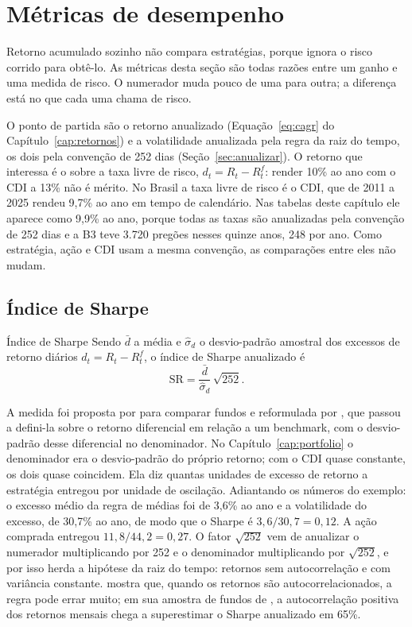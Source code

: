 \section{Métricas de desempenho}
\label{sec:c10-metricas}

Retorno acumulado sozinho não compara estratégias, porque ignora o risco corrido para obtê-lo. As métricas desta seção são todas razões entre um ganho e uma medida de risco. O numerador muda pouco de uma para outra; a diferença está no que cada uma chama de risco.

O ponto de partida são o retorno anualizado (Equação~\eqref{eq:cagr} do Capítulo~\ref{cap:retornos}) e a volatilidade anualizada pela regra da raiz do tempo, os dois pela convenção de 252 dias (Seção~\ref{sec:anualizar}). O retorno que interessa é o  sobre a taxa livre de risco, $d_t = R_t - R^f_t$: render 10\% ao ano com o CDI a 13\% não é mérito. No Brasil a taxa livre de risco é o CDI, que de 2011 a 2025 rendeu 9,7\% ao ano em tempo de calendário. Nas tabelas deste capítulo ele aparece como 9,9\% ao ano, porque todas as taxas são anualizadas pela convenção de 252 dias e a B3 teve 3.720 pregões nesses quinze anos, 248 por ano. Como estratégia, ação e CDI usam a mesma convenção, as comparações entre eles não mudam.

\subsection{Índice de Sharpe}

\begin{definicao}{Índice de Sharpe}
Sendo $\bar d$ a média e $\hat\sigma_d$ o desvio-padrão amostral dos excessos de retorno diários $d_t = R_t - R^f_t$, o índice de Sharpe anualizado é
\begin{equation}
  \text{SR} = \frac{\bar d}{\hat\sigma_d}\,\sqrt{252} .
  \label{eq:c10-sharpe}
\end{equation}
\end{definicao}

A medida foi proposta por \citet{sharpe1966} para comparar fundos e reformulada por \citet{sharpe1994}, que passou a defini-la sobre o retorno diferencial em relação a um benchmark, com o desvio-padrão desse diferencial no denominador. No Capítulo~\ref{cap:portfolio} o denominador era o desvio-padrão do próprio retorno; com o CDI quase constante, os dois quase coincidem. Ela diz quantas unidades de excesso de retorno a estratégia entregou por unidade de oscilação. Adiantando os números do exemplo: o excesso médio da regra de médias foi de 3,6\% ao ano e a volatilidade do excesso, de 30,7\% ao ano, de modo que o Sharpe é $3,6/30,7 = 0,12$. A ação comprada entregou $11,8/44,2 = 0,27$. O fator $\sqrt{252}$ vem de anualizar o numerador multiplicando por 252 e o denominador multiplicando por $\sqrt{252}$, e por isso herda a hipótese da raiz do tempo: retornos sem autocorrelação e com variância constante. \citet{lo2002} mostra que, quando os retornos são autocorrelacionados, a regra pode errar muito; em sua amostra de fundos de , a autocorrelação positiva dos retornos mensais chega a superestimar o Sharpe anualizado em 65\%.

